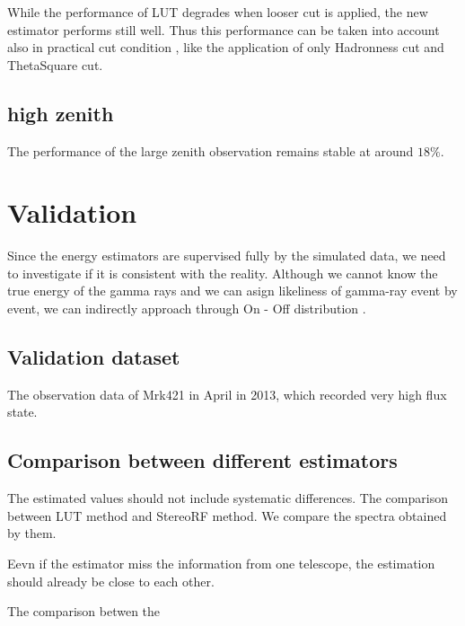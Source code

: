 \documentclass[preprint,12pt,authoryear]{elsarticle}
\begin{document}
While the performance of LUT degrades when looser cut is applied, the new estimator performs still well. 
Thus this performance can be taken into account also in practical cut condition , like the application of only Hadronness cut and ThetaSquare cut.

\subsection{high zenith}
The performance of the large zenith observation remains stable at around $18 \%$. 





\section{Validation}
%
Since the energy estimators are supervised fully by the simulated data, we need to investigate if it is consistent with the reality. Although we cannot know  the true energy of the gamma rays and we can asign likeliness of gamma-ray event by event,  we can indirectly approach through On - Off distribution . 

\subsection{Validation dataset}
%
The observation data of Mrk421 in April in 2013, which recorded very high flux state. 

\subsection{Comparison between different estimators}
The estimated values should not include systematic differences. 
The comparison between LUT method and StereoRF method.
We compare the spectra obtained by them.




Eevn if the estimator miss the information from one telescope, the estimation should already be close to each other.


The comparison betwen the 
\end{document}
